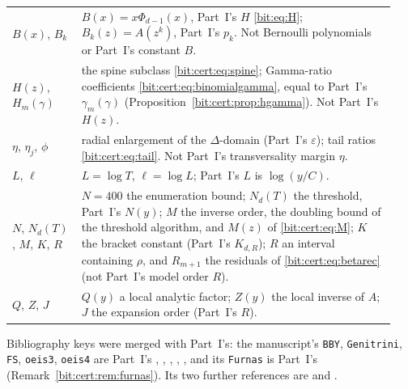 \documentclass[11pt]{article}
\theoremstyle{definition}\newtheorem{definition}[theorem]{Definition}
\theoremstyle{remark}\newtheorem{remark}[theorem]{Remark}
\begin{document}
\begin{center}
\begin{tabular}{@{}>{\raggedright\arraybackslash}p{0.17\linewidth}>{\raggedright\arraybackslash}p{0.77\linewidth}@{}}
$B(x)$, $B_k$ & $B(x)=x\Phi_{d-1}(x)$, Part~I's $H$ \eqref{bit:eq:H}; $B_k(z)=A(z^k)$, Part~I's $p_k$. Not Bernoulli polynomials or Part~I's constant $B$.\\
$H(z)$, $H_m(\gamma)$ & the spine subclass \eqref{bit:cert:eq:spine}; Gamma-ratio coefficients \eqref{bit:cert:eq:binomialgamma}, equal to Part~I's $\gamma_m(\gamma)$ (Proposition~\ref{bit:cert:prop:hgamma}). Not Part~I's $H(z)$.\\
$\eta$, $\eta_j$, $\phi$ & radial enlargement of the $\Delta$-domain (Part~I's $\varepsilon$); tail ratios \eqref{bit:cert:eq:tail}. Not Part~I's transversality margin $\eta$.\\
$L$, $\ell$ & $L=\log T$, $\ell=\log L$; Part~I's $L$ is $\log(y/C)$.\\
$N$, $N_d(T)$, $M$, $K$, $R$ & $N=400$ the enumeration bound; $N_d(T)$ the threshold, Part~I's $N(y)$; $M$ the inverse order, the doubling bound of the threshold algorithm, and $M(z)$ of \eqref{bit:cert:eq:M}; $K$ the bracket constant (Part~I's $K_{d,R}$); $R$ an interval containing $\rho$, and $R_{m+1}$ the residuals of \eqref{bit:cert:eq:betarec} (not Part~I's model order $R$).\\
$Q$, $Z$, $J$ & $Q(y)$ a local analytic factor; $Z(y)$ the local inverse of $A$; $J$ the expansion order (Part~I's $R$).\\
\bottomrule
\end{tabular}
\end{center}
Bibliography keys were merged with Part~I's: the manuscript's \texttt{BBY},
\texttt{Genitrini}, \texttt{FS}, \texttt{oeis3}, \texttt{oeis4} are Part~I's
\cite{bby}, \cite{genitrini}, \cite{fs}, \cite{oeis3}, \cite{oeis4}, and its
\texttt{Furnas} is Part~I's \cite{hkq} (Remark~\ref{bit:cert:rem:furnas}). Its
two further references are \cite{labelle} and \cite{kmpr}.
\end{document}
